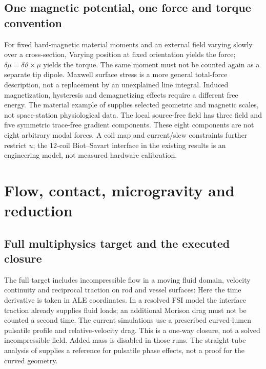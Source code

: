 \subsection{One magnetic potential, one force and torque convention}
For fixed hard-magnetic material moments and an external field varying slowly over a cross-section,
\EqMagneticEnergy
Varying position at fixed orientation yields the force; $\delta\mu=\delta\vartheta\times\mu$ yields the torque. The same moment must not be counted again as a separate tip dipole. Maxwell surface stress is a more general total-force description, not a replacement by an unexplained line integral. Induced magnetization, hysteresis and demagnetizing effects require a different free energy. The material example of \citet{tong2025} supplies selected geometric and magnetic scales, not space-station physiological data.
\EqMagneticPort
The local source-free field has three field and five symmetric trace-free gradient components. These eight components are not eight arbitrary modal forces. A coil map and current/slew constraints further restrict $u$; the 12-coil Biot--Savart interface in the existing results is an engineering model, not measured hardware calibration.

\PaperPage
\section{Flow, contact, microgravity and reduction}
\subsection{Full multiphysics target and the executed closure}
The full target includes incompressible flow in a moving fluid domain, velocity continuity and reciprocal traction on rod and vessel surfaces:
\EqFluid
Here the time derivative is taken in ALE coordinates. In a resolved FSI model the interface traction already supplies fluid loads; an additional Morison drag must not be counted a second time. The current simulations use a prescribed curved-lumen pulsatile profile and relative-velocity drag. This is a one-way closure, not a solved incompressible field. Added mass is disabled in those runs. The straight-tube analysis of \citet{womersley1955} supplies a reference for pulsatile phase effects, not a proof for the curved geometry.

